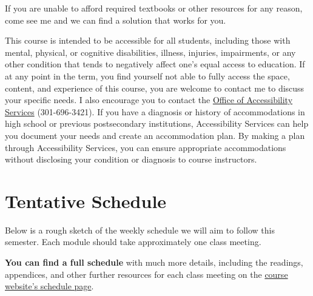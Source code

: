 \documentclass{article}
\begin{document}
If you are unable to afford required textbooks or other resources for
any reason, come see me and we can find a solution that works for you.

This course is intended to be accessible for all students, including
those with mental, physical, or cognitive disabilities, illness,
injuries, impairments, or any other condition that tends to negatively
affect one's equal access to education. If at any point in the term, you
find yourself not able to fully access the space, content, and
experience of this course, you are welcome to contact me to discuss your
specific needs. I also encourage you to contact the
\href{https://www.hood.edu/academics/josephine-steiner-center-academic-achievement-retention/accessibility-services}{Office
of Accessibility Services} (301-696-3421). If you have a diagnosis or
history of accommodations in high school or previous postsecondary
institutions, Accessibility Services can help you document your needs
and create an accommodation plan. By making a plan through Accessibility
Services, you can ensure appropriate accommodations without disclosing
your condition or diagnosis to course instructors.

\hypertarget{tentative-schedule}{%
\section*{Tentative Schedule}\label{tentative-schedule}}

Below is a rough sketch of the weekly schedule we will aim to follow
this semester. Each module should take approximately one class meeting.

\textbf{You can find a full schedule} with much more details, including
the readings, appendices, and other further resources for each class
meeting on the
\href{http://thoughtF20.classes.ryansafner.com/schedule/}{course
website's schedule page}.
\end{document}
